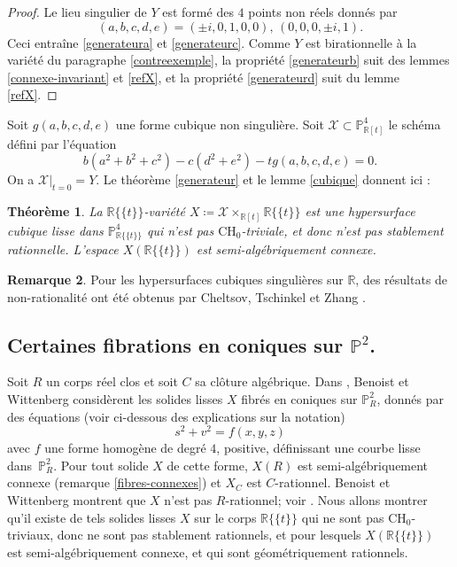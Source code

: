 \documentclass[JEP,XML,SOM,Unicode,francais,published]{cedram}
\newcommand{\CH}{\mathrm{CH}}
\newtheorem{thm}{Théorème}[section]
\theoremstyle{definition}
\newtheorem{rmk}[thm]{Remarque}
\newcommand{\R}{\mathbb R}
\renewcommand{\P}{\mathbb P}
\newcommand{\mc}[1]{\mathcal{#1}}
\newcommand{\puiseux}{\mathbb{R}\{\!\{t\}\!\}}
\begin{document}
\begin{proof}
Le lieu singulier de $Y$ est formé des $4$ points non réels donnés par
\[
(a,b,c,d,e) = (\pm i, 0,1,0,0),\, (0,0,0, \pm i, 1).
\]
Ceci entraîne \eqref{generateura} et \eqref{generateurc}. Comme $Y$ est birationnelle à la variété du paragraphe \ref{contreexemple}, la propriété \eqref{generateurb} suit des lemmes \ref{connexe-invariant} et \ref{refX}, et la propriété \eqref{generateurd} suit du lemme \ref{refX}.
\end{proof}

Soit $g(a,b,c,d,e)$ une forme cubique non singulière. Soit $\mc{X} \subset \P^4_{\R[t]}$ le schéma défini par l'équation
\[
b(a^2+b^2+c^2) - c(d^2+e^2) -tg(a,b,c,d,e)=0.
\]
On a $\mc{X}|_{t=0}=Y$. Le théorème \ref{generateur} et le lemme \ref{cubique} donnent ici :

\begin{thm}\label{prop-cubique}
La $\puiseux$-variété $X\coloneqq \mc{X}\times_{\R[t]} \puiseux$ est une hypersurface cubique lisse dans $\P^4_{\puiseux}$ qui n'est pas $\CH_0$-triviale, et donc n'est pas
stablement rationnelle. L'espace $X(\puiseux)$ est semi-algébriquement connexe.
\end{thm}

\begin{rmk}
Pour les hypersurfaces cubiques singulières sur $\R$, des résultats de non-rationalité ont été obtenus par Cheltsov, Tschinkel et Zhang \cite{cheltsov2024rationality}.
\end{rmk}

\subsection{Certaines fibrations en coniques sur \texorpdfstring{$\P^2$}{P2}.}

Soit $R$ un corps réel clos et soit $C$ sa clôture algébrique. Dans \cite{benoist2020clemens}, Benoist et Wittenberg considèrent les solides lisses $X$ fibrés en coniques sur
$\P^2_R$, donnés par des équations (voir ci-dessous des explications sur la notation)
\[
s^2+v^2=f(x,y,z)
\]
avec $f$ une forme homogène de degré $4$, positive,
définissant une courbe lisse dans~$\P^2_R$. Pour tout solide $X$ de cette forme, $X(R)$ est semi-algébriquement connexe (\cf remarque \ref{fibres-connexes}) et $X_C$ est $C$-rationnel. Benoist et Wittenberg montrent que $X$ n'est pas $R$-rationnel; voir \cite[Cor.\,3.6]{benoist2020clemens}. Nous allons montrer qu'il existe de tels solides lisses $X$ sur le corps $\puiseux$ qui ne sont pas $\CH_0$-triviaux, donc ne sont pas stablement rationnels, et pour lesquels $X(\puiseux)$ est semi-algébriquement connexe, et qui sont géométriquement rationnels.
\end{document}
